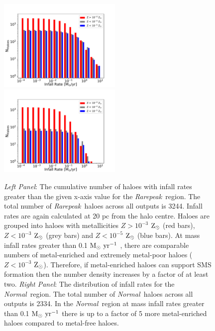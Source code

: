 \documentclass[graphics, twocolumn, usenatbib]{mn2e}
\newcommand{\msolaryr} {$\rm{M_{\odot}~yr^{-1}}~$}
\newcommand{\zsolar} {$\rm{Z_{\odot}}~$}
\newcommand{\zsolarc} {$\rm{Z_{\odot}}$}
\newcommand{\rarepeak} {\textit{Rarepeak~}}
\newcommand{\normal} {\textit{Normal~}}
\begin{document}
\begin{figure}
\centering
\begin{minipage}{175mm}      \begin{center} 
\centerline{
\includegraphics[width=0.525\textwidth]{FIGURES/Rarepeak_NHaloes.pdf}
\includegraphics[width=0.525\textwidth]{FIGURES/Normal_NHaloes.pdf}}
\caption{\textit{Left Panel}: The cumulative number of haloes with infall rates greater than the given
  x-axis value for the \rarepeak region.  The total number of \rarepeak haloes across all outputs
  is 3244. 
  Infall rates are again calculated at 20 pc from the halo centre.
  Haloes are grouped into haloes with metallicities $Z> 10^{-3}$ \zsolar (red bars),
  $Z< 10^{-3}$ \zsolar (grey bars) and  $Z< 10^{-5}$ \zsolar (blue bars). At mass infall
  rates greater than 0.1 \msolaryr, there are comparable numbers of metal-enriched and extremely
  metal-poor haloes ($Z< 10^{-3}$ \zsolarc). Therefore, if metal-enriched haloes can support SMS
  formation then the number density increases by a factor of at least two. 
  \textit{Right Panel}: The distribution of
  infall rates for the \normal region. The  total number of \normal haloes across all outputs is 2334.
  In the \normal region at mass infall
  rates greater than 0.1 \msolaryr there is up to a factor of 5 more metal-enriched haloes compared to
  metal-free haloes. 
 } \label{Fig:Histogram}
\end{center} \end{minipage}

\end{figure}
\end{document}
